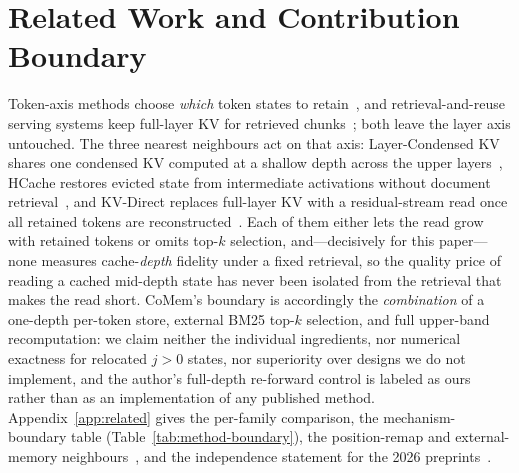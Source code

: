 \section{Related Work and Contribution Boundary}
\label{sec:related}

Token-axis methods choose \emph{which} token states to
retain~\citep{streamingllm,h2o,snapkv,pyramidkv,compresskv}, and
retrieval-and-reuse serving systems keep full-layer KV for retrieved
chunks~\citep{cacheblend,ragcache,promptcache}; both leave the layer axis
untouched.  The three nearest neighbours act on that axis: Layer-Condensed KV
shares one condensed KV computed at a shallow depth across the upper
layers~\citep{lckv}, HCache restores evicted state from intermediate
activations without document retrieval~\citep{hcache}, and KV-Direct replaces
full-layer KV with a residual-stream read once all retained tokens are
reconstructed~\citep{kvdirect}.  Each of them either lets the read grow with
retained tokens or omits top-$k$ selection, and---decisively for this
paper---none measures cache-\emph{depth} fidelity under a fixed retrieval, so
the quality price of reading a cached mid-depth state has never been isolated
from the retrieval that makes the read short.  CoMem's boundary is accordingly
the \emph{combination} of a one-depth per-token store, external BM25 top-$k$
selection, and full upper-band recomputation: we claim neither the individual
ingredients, nor numerical exactness for relocated $j>0$ states, nor superiority
over designs we do not implement, and the author's full-depth re-forward control
is labeled as ours rather than as an implementation of any published method.
Appendix~\ref{app:related} gives the per-family comparison, the
mechanism-boundary table (Table~\ref{tab:method-boundary}), the position-remap
and external-memory neighbours~\citep{infllm,yoco,landmark,longllama,retro,memorizingtransformers,unlimiformer},
and the independence statement for the 2026
preprints~\citep{kvdirect,kvcat,compresskv}.
